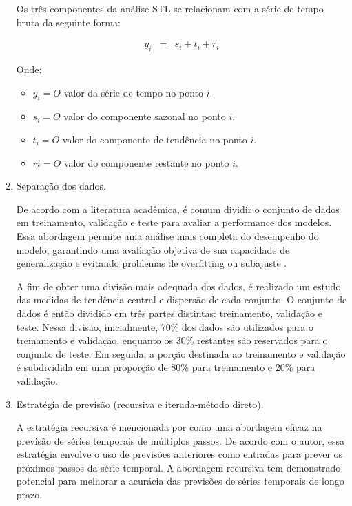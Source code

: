 \begin{enumerate}[start=1, label = {\textbf{Etapa} \arabic*} ]
        Os três componentes da análise STL se relacionam com a série de tempo bruta da seguinte forma:
        
        \begin{eqnarray}
        	y_i &=& s_i + t_i + r_i
        \end{eqnarray}
    	
    	Onde:
    	
    	\begin{itemize}
    		\item $y_i = O$ valor da série de tempo no ponto $i$.
    		\item $s_i = O$ valor do componente sazonal no ponto $i$.
    		\item $t_i = O$ valor do componente de tendência no ponto $i$.
    		\item $ri = O$ valor do componente restante no ponto $i$.
    	\end{itemize}
    	\item \label{etp:4} Separação dos dados.
    	
  
    De acordo com a literatura acadêmica, é comum dividir o conjunto de dados em treinamento, validação e teste para avaliar a performance dos modelos. Essa abordagem permite uma análise mais completa do desempenho do modelo, garantindo uma avaliação objetiva de sua capacidade de generalização e evitando problemas de overfitting ou subajuste \cite{cruz-ramirez2020enhancing,mokhtari2020deep,khan2021hybrid,sharma2021deep}.
    
    A fim de obter uma divisão mais adequada dos dados, é realizado um estudo das medidas de tendência central e dispersão de cada conjunto. O conjunto de dados é então dividido em três partes distintas: treinamento, validação e teste. Nessa divisão, inicialmente, 70\% dos dados são utilizados para o treinamento e validação, enquanto os 30\% restantes são reservados para o conjunto de teste. Em seguida, a porção destinada ao treinamento e validação é subdividida em uma proporção de 80\% para treinamento e 20\% para validação.
    	
    	
    	\item Estratégia de previsão (recursiva e iterada-método direto). \label{etp:5}
    	
    	A estratégia recursiva é mencionada por  como uma abordagem eficaz na previsão de séries temporais de múltiplos passos. De acordo com o autor, essa estratégia envolve o uso de previsões anteriores como entradas para prever os próximos passos da série temporal. A abordagem recursiva tem demonstrado potencial para melhorar a acurácia das previsões de séries temporais de longo prazo.
    	

\end{enumerate}

